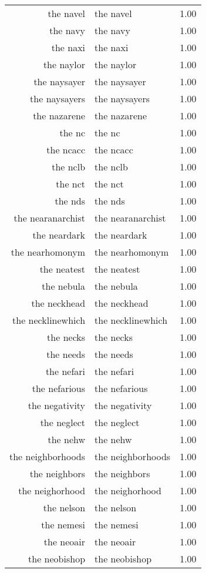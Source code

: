 \begin{table}[ht]
\begin{tabular}{rlr}
  the navel & the navel & 1.00 \\ 
  the navy & the navy & 1.00 \\ 
  the naxi & the naxi & 1.00 \\ 
  the naylor & the naylor & 1.00 \\ 
  the naysayer & the naysayer & 1.00 \\ 
  the naysayers & the naysayers & 1.00 \\ 
  the nazarene & the nazarene & 1.00 \\ 
  the nc & the nc & 1.00 \\ 
  the ncacc & the ncacc & 1.00 \\ 
  the nclb & the nclb & 1.00 \\ 
  the nct & the nct & 1.00 \\ 
  the nds & the nds & 1.00 \\ 
  the nearanarchist & the nearanarchist & 1.00 \\ 
  the neardark & the neardark & 1.00 \\ 
  the nearhomonym & the nearhomonym & 1.00 \\ 
  the neatest & the neatest & 1.00 \\ 
  the nebula & the nebula & 1.00 \\ 
  the neckhead & the neckhead & 1.00 \\ 
  the necklinewhich & the necklinewhich & 1.00 \\ 
  the necks & the necks & 1.00 \\ 
  the needs & the needs & 1.00 \\ 
  the nefari & the nefari & 1.00 \\ 
  the nefarious & the nefarious & 1.00 \\ 
  the negativity & the negativity & 1.00 \\ 
  the neglect & the neglect & 1.00 \\ 
  the nehw & the nehw & 1.00 \\ 
  the neighborhoods & the neighborhoods & 1.00 \\ 
  the neighbors & the neighbors & 1.00 \\ 
  the neighorhood & the neighorhood & 1.00 \\ 
  the nelson & the nelson & 1.00 \\ 
  the nemesi & the nemesi & 1.00 \\ 
  the neoair & the neoair & 1.00 \\ 
  the neobishop & the neobishop & 1.00 \\ 

\end{tabular}
\end{table}

